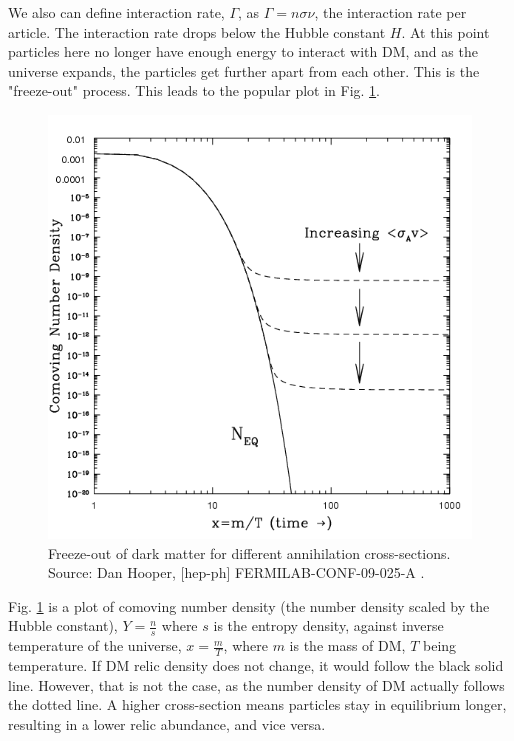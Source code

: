 \documentclass[12pt]{article}
\begin{document}
We also can define interaction rate, $\Gamma$, as $\Gamma = n\sigma\nu$, the interaction rate per article. The interaction rate drops below the Hubble constant $H$. At this point particles here no longer have enough energy to interact with DM, and as the universe expands, the particles get further apart from each other. This is the "freeze-out" process. This leads to the popular plot in Fig. \ref{fig:freezeout}.

\begin{figure}
    \includegraphics[width=\linewidth]{Documents/Thesis/Figs/Thermal-freeze-out-of-dark-matter-for-different-annihilation-cross-sections-c-Dan.jpg}
    \caption{Freeze-out of dark matter for different annihilation cross-sections. Source: Dan Hooper, [hep-ph] FERMILAB-CONF-09-025-A \cite{hooper2009tasi2008lecturesdark}.}
    \label{fig:freezeout}
\end{figure}

Fig. \ref{fig:freezeout} is a plot of comoving number density (the number density scaled by the Hubble constant), $Y = \frac{n}{s}$ where $s$ is the entropy density, against inverse temperature of the universe, $x = \frac{m}{T}$, where $m$ is the mass of DM, $T$ being temperature. If DM relic density does not change, it would follow the black solid line. However, that is not the case, as the number density of DM actually follows the dotted line. A higher cross-section means particles stay in equilibrium longer, resulting in a lower relic abundance, and vice versa.
\end{document}
